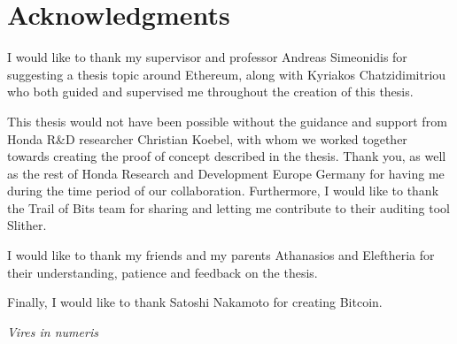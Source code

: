 \chapter*{Acknowledgments}

I would like to thank my supervisor and professor Andreas Simeonidis for suggesting a thesis topic around Ethereum, along with Kyriakos Chatzidimitriou who both guided and supervised me throughout the creation of this thesis. 

This thesis would not have been possible without the guidance and support from Honda R\&D researcher Christian Koebel, with whom we worked together towards creating the proof of concept described in the thesis. Thank you, as well as the rest of Honda Research and Development Europe Germany for having me during the time period of our collaboration. Furthermore, I would like to thank the Trail of Bits team for sharing and letting me contribute to their auditing tool Slither.

I would like to thank my friends and my parents Athanasios and Eleftheria for their understanding, patience and feedback on the thesis.

Finally, I would like to thank Satoshi Nakamoto for creating Bitcoin. 

\hfill \textit{Vires in numeris}
